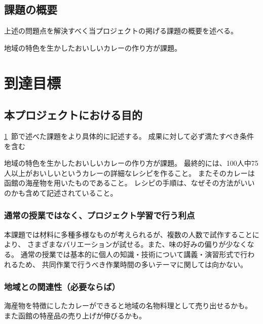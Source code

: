 \documentclass[openany,11pt,papersize]{jsbook}
\begin{document}
\section{課題の概要}\label{sec:gaiyou}
\begin{hissu}
 上述の問題点を解決すべく当プロジェクトの掲げる課題の概要を述べる。
\end{hissu}
地域の特色を生かしたおいしいカレーの作り方が課題。




\chapter{到達目標}

\section{本プロジェクトにおける目的}\label{sec:mokuteki}
\begin{hissu}
\ref{sec:gaiyou}~節で述べた課題をより具体的に記述する。
成果に対して必ず満たすべき条件を含む
\end{hissu}

地域の特色を生かしたおいしいカレーの作り方が課題。
最終的には、100人中75人以上がおいしいというカレーの詳細なレシピを作ること。
またそのカレーは函館の海産物を用いたものであること。
レシピの手順は、なぜその方法がいいのかも含めて記述されていること。

\subsection{通常の授業ではなく、プロジェクト学習で行う利点}

本課題では材料に多種多様なものが考えられるが、複数の人数で試作することにより、 
さまざまなバリエーションが試せる。また、味の好みの偏りが少なくなる。 
通常の授業では基本的に個人の知識・技術について講義・演習形式で行われるため、 
共同作業で行うべき作業時間の多いテーマに関しては向かない。


\subsection{地域との関連性（必要ならば）}

海産物を特徴にしたカレーができると地域の名物料理として売り出せるかも。 
また函館の特産品の売り上げが伸びるかも。

\end{document}
